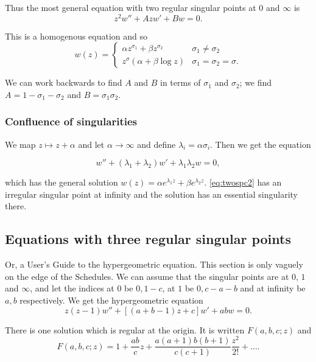 \documentclass{notes}
\theoremstyle{plain}
\begin{document}
Thus the most general equation with two regular singular points
at $0$ and $\infty$ is
\begin{equation}\label{eq:twosp}
z^2 w'' + A z w' + B w = 0.
\end{equation}

This is a homogenous equation and so
\[
w(z) = \begin{cases}
\alpha z^{\sigma_1} + \beta z^{\sigma_2} & \sigma_1 \neq \sigma_2 \\
z^\sigma \left( \alpha + \beta \log z\right) & \sigma_1 = \sigma_2 = \sigma.
\end{cases}
\]

We can work backwards to find $A$ and $B$ in terms of $\sigma_1$ and
$\sigma_2$; we find $A = 1 - \sigma_1 - \sigma_2$ and $B = \sigma_1 \sigma_2$.

\subsubsection*{Confluence of singularities}

We map $z \mapsto z+\alpha$ and let $\alpha \to \infty$ and define
$\lambda_i = \alpha \sigma_i$.  Then we get the equation

\begin{equation}\label{eq:twospc2}
w'' + (\lambda_1 + \lambda_2) w' + \lambda_1 \lambda_2 w = 0,
\end{equation}

which has the general solution $w(z) = \alpha e^{\lambda_1 z}
+ \beta e^{\lambda_2 z}$.  \eqref{eq:twospc2} has an irregular singular
point at infinity and the solution has an essential singularity there.

\subsection{Equations with three regular singular points}

Or, a User's Guide to the hypergeometric equation.  This section is only
vaguely on the edge of the Schedules.  We can assume that the 
singular points are at $0$, $1$ and $\infty$, and let the
indices at $0$ be $0,1-c$, at $1$ be $0,c-a-b$ and at infinity be $a,b$
respectively.  We get the hypergeometric equation
\begin{equation}\label{eq:hypgeo}
z(z-1) w'' + \left[\left( a+b-1\right)z + c \right] w' + a b w = 0.
\end{equation}

There is one solution which is regular at the origin.  It
is written $F(a,b,c;z)$ and
\begin{equation}\label{eq:Ffn}
F(a,b,c;z) = 1 + \frac{a b}{c} z + \frac{a(a+1) b(b+1)}{c (c+1)} \frac{z^2}{2!}
+ \dots.
\end{equation}
\end{document}
